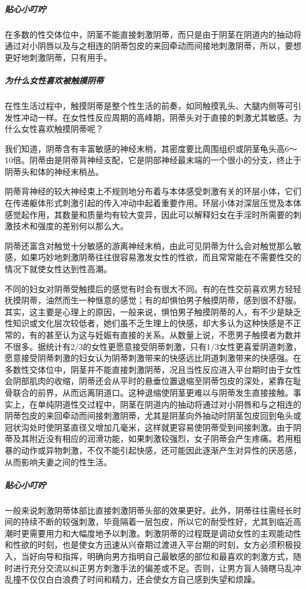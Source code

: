 \begin{enumerate}
\subparagraph{贴心小叮咛}
在多数的性交体位中，阴茎不能直接刺激阴蒂，而只是由于阴茎在阴道内的抽动将通过对小阴唇以及与之相连的阴蒂包皮的来回牵动而间接地刺激阴蒂，所以，要想更好地刺激阴蒂，只有用手。

\subparagraph{为什么女性喜欢被触摸阴蒂}
在性生活过程中，触摸阴蒂是整个性生活的前奏，如同触摸乳头、大腿内侧等可引发性冲动一样。在女性性反应周期的高峰期，阴蒂头对于直接的刺激尤其敏感。为什么女性喜欢触摸阴蒂呢？

我们知道，阴蒂含有丰富敏感的神经末梢，其密度要比周围组织或阴茎龟头高6～10倍。阴蒂由是阴蒂背神经支配，它是阴部神经最末端的一个很小的分支，终止于阴蒂头和体的神经末梢丛。

阴蒂背神经的较大神经束上不规则地分布着与本体感受刺激有关的环层小体，它们在传递躯体形式刺激引起的传入冲动中起着重要作用。环层小体对深层压觉及本体感觉起作用，其数量和质量均有较大变异，因此可以解释妇女在手淫时所需要的刺激技术和强度的差别何以那么大。

阴蒂还富含对触觉十分敏感的游离神经末梢，由此可见阴蒂为什么会对触觉那么敏感，如果巧妙地刺激阴蒂往往很容易激发女性的性欲，而且常常能在不需要性交的情况下就使女性达到性高潮。

不同的妇女对阴蒂受触摸后的感觉有时会有很大不同。有的在性交前喜欢男方轻轻抚摸阴蒂，油然而生一种惬意的感觉；有的却惧怕男子触摸阴蒂，感到很不舒服。其实，这主要是心理上的原因，一般来说，惧怕男子触摸阴蒂的人，有不少是缺乏性知识或文化层次较低者，她们虽不乏生理上的快感，却大多认为这种快感是不正常的，有的甚至认为这与妊娠有直接的关系。从数量上说，不愿男子触摸者为数并不很多。据统计有2/3的女性更愿意接受阴蒂刺激，只有1/3女性更喜爱阴道刺激，愿意接受阴蒂刺激的妇女认为阴蒂刺激带来的快感远比阴道刺激带来的快感强。在多数性交体位中，阴茎并不能直接刺激阴蒂，况且当性反应进入平台期时由于女性会阴部肌肉的收缩，阴蒂还会从平时的悬垂位置退缩至阴蒂包皮的深处，紧靠在耻骨联合的前界，从而远离阴道口。这种退缩使阴茎更难以与阴蒂发生直接接触。事实上，在单纯阴道性交过程中，阴茎在阴道内的抽动将通过对小阴唇和与之相连的阴蒂包皮的来回牵动而间接刺激阴蒂，尤其是阴茎向外抽动时阴茎包皮回到龟头或冠状沟处时使阴茎直径又增加几毫米，这样就更容易使阴蒂受到间接刺激。由于阴蒂及其附近没有相应的润滑功能，如果刺激较强烈，女子阴蒂会产生疼痛。若用粗暴的动作或异物刺激，不仅不能引起快感，还可能因此逐渐产生对异性的厌恶感，从而影响夫妻之间的性生活。

\subparagraph{贴心小叮咛}
一般来说刺激阴蒂体部比直接刺激阴蒂头部的效果更好。此外，阴蒂往往需经长时间的持续不断的较强刺激，毕竟隔着一层包皮，所以它的耐受性好，尤其到临近高潮时更需要用力和大幅度地予以刺激。刺激阴蒂的过程既是调动女性的主观能动性和性欲的时刻，也是使女方迅速从兴奋期过渡进入平台期的时刻，女方必须积极投入，当好向导和指挥，明确向男方指明自己最敏感的部位和最喜欢的刺激方式，随时进行充分交流以纠正男方刺激手法的偏差或不足。否则，让男方盲人骑瞎马乱冲乱撞不仅仅白白浪费了时间和精力，还会使女方自己感到失望和烦躁。


\end{enumerate}
